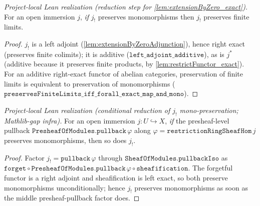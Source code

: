 \begin{lemma}

  \label{lem:extensionByZero_exact_of_mono}
  \textit{Project-local Lean realization (reduction step for \cref{lem:extensionByZero_exact}).}
  For an open immersion $j$, \emph{if} $j_!$ preserves monomorphisms then $j_!$
  preserves finite limits.
  \begin{proof}
    $j_!$ is a left adjoint (\cref{lem:extensionByZeroAdjunction}), hence
    right exact (preserves finite colimits); it is additive ($\mathtt{left\_adjoint\_additive}$),
    as is $j^{*}$ (additive because it preserves finite products, by
    \cref{lem:restrictFunctor_exact}). For an additive right-exact functor of
    abelian categories, preservation of finite limits is equivalent to
    preservation of monomorphisms
    ($\mathtt{preservesFiniteLimits\_iff\_forall\_exact\_map\_and\_mono}$).
  \end{proof}
\end{lemma}

\begin{lemma}

  \label{lem:extensionByZero_preservesMono}
  \textit{Project-local Lean realization (conditional reduction of $j_!$
  mono-preservation; Mathlib-gap infra).}
  For an open immersion $j : U \hookrightarrow X$, \emph{if} the presheaf-level
  pullback $\mathtt{PresheafOfModules.pullback}\,\varphi$ along
  $\varphi = \mathtt{restrictionRingSheafHom}\,j$ preserves monomorphisms, then so
  does $j_!$.
  \begin{proof}
    Factor $j_! = \mathtt{pullback}\,\varphi$ through
    $\mathtt{SheafOfModules.pullbackIso}$ as
    $\mathtt{forget} \circ \mathtt{PresheafOfModules.pullback}\,\varphi \circ
    \mathtt{sheafification}$. The forgetful functor is a right adjoint and
    sheafification is left exact, so both preserve monomorphisms unconditionally;
    hence $j_!$ preserves monomorphisms as soon as the middle presheaf-pullback
    factor does.
  \end{proof}
\end{lemma}

